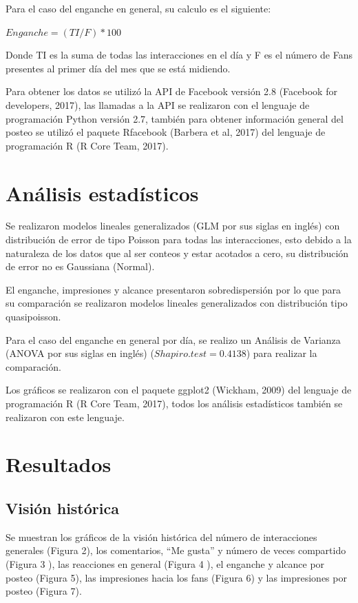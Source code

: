 \documentclass[a4paper,10pt]{article}
\begin{document}
Para el caso del enganche en general, su calculo es el siguiente:\\
\begin{center}
$\displaystyle Enganche = (TI/F)*100$ \\
\end{center}

Donde TI es la suma de todas las interacciones en el día y F es el número de Fans presentes
al primer día del mes que se está midiendo.

Para obtener los datos se utilizó la API de Facebook versión 2.8 (Facebook for developers, 2017), las llamadas
a la API se realizaron con el lenguaje de programación Python versión 2.7, 
también para obtener información general del posteo se utilizó el paquete Rfacebook (Barbera et al, 2017)
del lenguaje de programación R (R Core Team, 2017).


\section{Análisis estadísticos}
Se realizaron modelos lineales generalizados (GLM por sus siglas en inglés) con distribución de error de tipo Poisson para
todas las interacciones, esto debido a la naturaleza de los datos que al ser conteos y estar acotados a cero,
su distribución de error no es Gaussiana (Normal).

El enganche, impresiones y alcance presentaron sobredispersión por lo que para su comparación se realizaron modelos lineales generalizados con 
distribución tipo quasipoisson.

Para el caso del enganche en general por día,  se realizo un Análisis de Varianza (ANOVA por sus siglas en inglés) 
($Shapiro.test = 0.4138$) para realizar la comparación.

Los gráficos se realizaron con el paquete ggplot2 (Wickham, 2009) del lenguaje de programación R (R Core Team, 2017),
todos los análisis estadísticos también se realizaron con este lenguaje.


\section{Resultados}
\subsection{Visión histórica}
Se muestran los gráficos de la visión histórica del número de interacciones generales 
(Figura 2), los comentarios, ``Me gusta'' y número de veces compartido (Figura 3 ),
las reacciones en general (Figura 4 ), el enganche y alcance por posteo (Figura 5),
las impresiones hacia los fans (Figura 6) y las impresiones por posteo (Figura 7).
\end{document}
